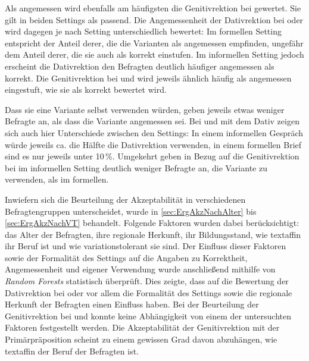 Als angemessen wird ebenfalls am häufigsten die Genitivrektion bei \dank{} gewertet. 
Sie gilt in beiden Settings als passend. 
Die Angemessenheit der Dativrektion bei \wegen{} oder \waehrend{} wird dagegen je nach Setting unterschiedlich bewertet:
Im formellen Setting entspricht der Anteil derer, die die Varianten als angemessen empfinden, ungefähr dem Anteil derer, die sie auch als korrekt einstufen. 
Im informellen Setting jedoch erscheint die Dativrektion den Befragten deutlich häufiger angemessen als korrekt. 
Die Genitivrektion bei \gegenueber{} und  wird jeweils ähnlich häufig als angemessen eingestuft, wie sie als korrekt bewertet wird. 

Dass sie eine Variante selbst verwenden würden, geben jeweils etwas weniger Befragte an, als dass die Variante angemessen sei.
Bei \wegen{} und \waehrend{} mit dem Dativ zeigen sich auch hier Unterschiede zwischen den Settings:
In einem informellen Gespräch würde jeweils ca. die Hälfte die Dativrektion verwenden, in einem formellen Brief sind es nur jeweils unter 10\,\%. 
Umgekehrt geben in Bezug auf die Genitivrektion bei  im informellen Setting deutlich weniger Befragte an, die Variante zu verwenden, als im formellen. 

Inwiefern sich die Beurteilung der Akzeptabilität in verschiedenen Befragtengruppen unterscheidet, wurde in \autoref{sec:ErgAkzNachAlter} bis \autoref{sec:ErgAkzNachVT} behandelt. 
Folgende Faktoren wurden dabei berücksichtigt:
das Alter der Befragten, ihre regionale Herkunft, ihr Bildungsstand, wie textaffin ihr Beruf ist und wie variationstolerant sie sind. 
Der Einfluss dieser Faktoren sowie der Formalität des Settings auf die Angaben zu Korrektheit, Angemessenheit und eigener Verwendung wurde anschließend mithilfe von \textit{Random Forests} statistisch überprüft. 
Dies zeigte, dass auf die Bewertung der Dativrektion bei \wegen{} oder \waehrend{} vor allem die Formalität des Settings sowie die regionale Herkunft der Befragten einen Einfluss haben. 
Bei der Beurteilung der Genitivrektion bei \dank{} und \gegenueber{} konnte keine Abhängigkeit von einem der untersuchten Faktoren festgestellt werden. 
Die Akzeptabilität der Genitivrektion mit der Primärpräposition  scheint zu einem gewissen Grad davon abzuhängen, wie textaffin der Beruf der Befragten ist. 

